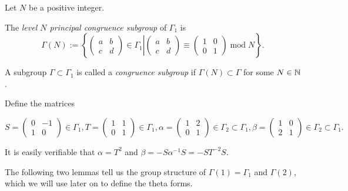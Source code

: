 Let $N$ be a positive integer.
\begin{definition}\label{def:level-N-princ-cong-subgp}\leanok
The \emph{level $N$ principal congruence subgroup} of $\Gamma_1$ is
$$
    \Gamma(N):=\left\{\left.\left(\begin{smallmatrix}a&b\\c&d\end{smallmatrix}\right)\in\Gamma_1\right|\left(\begin{smallmatrix}a&b\\c&d\end{smallmatrix}\right)\equiv\left(\begin{smallmatrix}1&0\\0&1\end{smallmatrix}\right)\;\mathrm{mod}\;N\right\}.
$$
\end{definition}

\begin{definition}\label{def:congruence-subgroup}\leanok
    A subgroup $\Gamma\subset\Gamma_1$ is called a \emph{congruence subgroup} if $\Gamma(N)\subset\Gamma$ for some $N\in\mathbb{N}$.
\end{definition}

\begin{definition}\label{def:Gamma-generators}\leanok
  Define the matrices

  \[
    S = \begin{pmatrix} 0 & -1 \\ 1 & 0 \end{pmatrix} \in \Gamma_1,
    T = \begin{pmatrix} 1 & 1 \\ 0 & 1 \end{pmatrix} \in \Gamma_1,
    \alpha = \begin{pmatrix} 1 & 2 \\ 0 & 1 \end{pmatrix} \in \Gamma_2 \subset \Gamma_1,
    \beta = \begin{pmatrix} 1 & 0 \\ 2 & 1 \end{pmatrix} \in \Gamma_2 \subset \Gamma_1.
  \]

  It is easily verifiable that $\alpha = T^2$ and $\beta = -S\alpha^{-1}S = -ST^{-2}S$.
\end{definition}

The following two lemmas tell us the group structure of $\Gamma(1) = \Gamma_1$ and $\Gamma(2)$, which we will use later on to define the theta forms.

